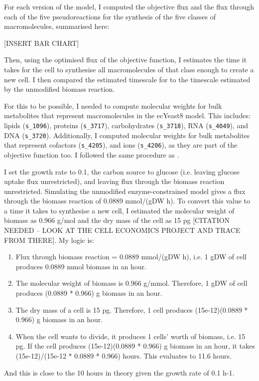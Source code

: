 For each version of the model, I computed the objective flux and the flux through each of the five pseudoreactions for the synthesis of the five classes of macromolecules, summarised here:

[INSERT BAR CHART]

Then, using the optimised flux of the objective function, I estimates the time it takes for the cell to synthesise all macromolecules of that class enough to create a new cell.
I then compared the estimated timescale for to the timescale estimated by the unmodified biomass reaction.

For this to be possible, I needed to compute molecular weights for bulk metabolites that represent macromolecules in the ecYeast8 model.
This includes: lipids (\texttt{s_1096}), proteins (\texttt{s_3717}), carbohydrates (\texttt{s_3718}), RNA (\texttt{s_4049}), and DNA (\texttt{s_3720}).
Additionally, I computed molecular weights for bulk metabolites that represent cofactors (\texttt{s_4205}), and ions (\texttt{s_4206}), as they are part of the objective function too.
I followed the same procedure as \parencite{takhaveevTemporalSegregationBiosynthetic2023}.

I set the growth rate to 0.1, the carbon source to glucose (i.e. leaving glucose uptake flux unrestricted), and leaving flux through the biomass reaction unrestricted.
Simulating the unmodified enzyme-constrained model gives a flux through the biomass reaction of 0.0889 mmol/(gDW h).
To convert this value to a time it takes to synthesise a new cell, I estimated the molecular weight of biomass as 0.966 g/mol \parencite{takhaveevTemporalSegregationBiosynthetic2023} and the dry mass of the cell as 15 pg [CITATION NEEDED -- LOOK AT THE CELL ECONOMICS PROJECT AND TRACE FROM THERE].
My logic is:
\begin{enumerate}
   \item Flux through biomass reaction = 0.0889 mmol/(gDW h), i.e. 1 gDW of cell produces 0.0889 mmol biomass in an hour.
   \item The molecular weight of biomass is 0.966 g/mmol.  Therefore, 1 gDW of cell produces (0.0889 * 0.966) g biomass in an hour.
   \item The dry mass of a cell is 15 pg.  Therefore, 1 cell produces (15e-12)(0.0889 * 0.966) g biomass in an hour.
   \item When the cell wants to divide, it produces 1 cells' worth of biomass, i.e. 15 pg.  If the cell produces (15e-12)(0.0889 * 0.966) g biomass in an hour, it takes (15e-12)/(15e-12 * 0.0889 * 0.966) hours.  This evaluates to 11.6 hours.
\end{enumerate}
And this is close to the 10 hours in theory given the growth rate of 0.1 h-1.

